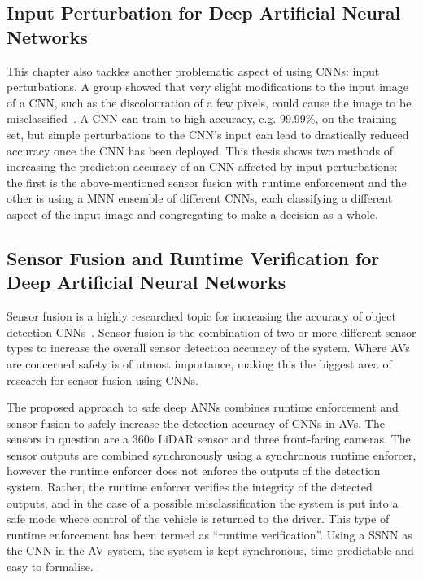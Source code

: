 \subsection{Input Perturbation for Deep Artificial Neural Networks}
This chapter also tackles another problematic aspect of using \acp{CNN}: input perturbations.
A group showed that very slight modifications to the input image of a \acf{CNN}, such as the discolouration of a few pixels, could cause the image to be misclassified~\cite{Gehr2018AI2SA, ann-pert}.
A \ac{CNN} can train to high accuracy, e.g. 99.99\%, on the training set, but simple perturbations to the \ac{CNN}'s input can lead to drastically reduced accuracy once the \ac{CNN} has been deployed.
This thesis shows two methods of increasing the prediction accuracy of an \ac{CNN} affected by input perturbations: the first is the above-mentioned sensor fusion with runtime enforcement and the other is using a \acf{MNN} ensemble of different \acp{CNN}, each classifying a different aspect of the input image and congregating to make a decision as a whole.


\subsection{Sensor Fusion and Runtime Verification for Deep Artificial Neural Networks}
Sensor fusion is a highly researched topic for increasing the accuracy of object detection \acp{CNN}~\cite{SensorFusion2017}. 
Sensor fusion is the combination of two or more different sensor types to increase the overall sensor detection accuracy of the system.
Where \acfp{AV} are concerned safety is of utmost importance, making this the biggest area of research for sensor fusion using \acp{CNN}.

The proposed approach to safe deep \acp{ANN} combines runtime enforcement and sensor fusion to safely increase the detection accuracy of \acp{CNN} in \acp{AV}.
The sensors in question are a 360$\circ$ \ac{LiDAR} sensor and three front-facing cameras.
The sensor outputs are combined synchronously using a synchronous runtime enforcer, however the runtime enforcer does not enforce the outputs of the detection system.
Rather, the runtime enforcer verifies the integrity of the detected outputs, and in the case of a possible misclassification the system is put into a safe mode where control of the vehicle is returned to the driver.
This type of runtime enforcement has been termed as ``runtime verification''.
Using a \acf{SSNN} as the \ac{CNN} in the \ac{AV} system, the system is kept synchronous, time predictable and easy to formalise.


